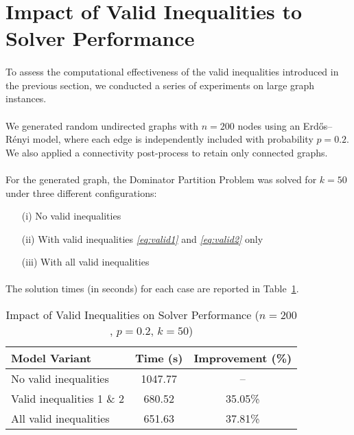 \section{Impact of Valid Inequalities to Solver Performance}
\label{sec:impact_of_valid_inequalities}


\paragraph{} To assess the computational effectiveness of the valid inequalities introduced in the previous section, we conducted a series of experiments on large graph instances.

\paragraph{} We generated random undirected graphs with $n = 200$ nodes using an Erdős–Rényi model, where each edge is independently included with probability $p = 0.2$. We also applied a connectivity post-process to retain only connected graphs.

\paragraph{} For the generated graph, the Dominator Partition Problem was solved for $k = 50$ under three different configurations:
\begin{itemize}
    \item[(i)] No valid inequalities
    \item[(ii)] With valid inequalities \textsl{\eqref{eq:valid1}} and \textsl{\eqref{eq:valid2}} only
    \item[(iii)] With all valid inequalities
\end{itemize}

\paragraph{} The solution times (in seconds) for each case are reported in Table~\ref{tab:performance}.

\begin{table}[H]
\centering
\caption{Impact of Valid Inequalities on Solver Performance ($n=200$, $p=0.2$, $k=50$)}
\label{tab:performance}
\begin{tabular}{l|c|c}
\textbf{Model Variant} & \textbf{Time (s)} & \textbf{Improvement (\%)} \\
\hline
No valid inequalities        & 1047.77 & -- \\
Valid inequalities 1 \& 2    & 680.52  & 35.05\% \\
All valid inequalities       & 651.63  & 37.81\% \\
\end{tabular}
\end{table}

